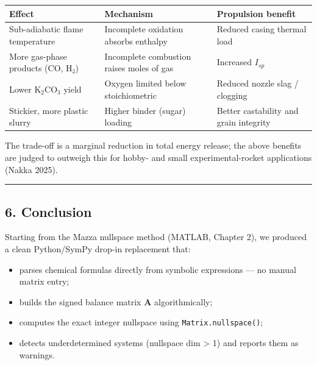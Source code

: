 \documentclass[11pt]{article}
\providecommand{\tightlist}{%
      \setlength{\itemsep}{0pt}\setlength{\parskip}{0pt}}
\begin{document}
{\def\LTcaptype{none} %
\begin{longtable}[]{@{}
  >{\raggedright\arraybackslash}p{}
  >{\raggedright\arraybackslash}p{}
  >{\raggedright\arraybackslash}p{}@{}}
\toprule\noalign{}
\begin{minipage}[b]{\linewidth}\raggedright
Effect
\end{minipage} & \begin{minipage}[b]{\linewidth}\raggedright
Mechanism
\end{minipage} & \begin{minipage}[b]{\linewidth}\raggedright
Propulsion benefit
\end{minipage} \\
\midrule\noalign{}
\endhead
\bottomrule\noalign{}
\endlastfoot
Sub-adiabatic flame temperature & Incomplete oxidation absorbs enthalpy
& Reduced casing thermal load \\
More gas-phase products (CO, H₂) & Incomplete combustion raises moles of
gas & Increased \(I_{sp}\) \\
Lower \(\text{K}_2\text{CO}_3\) yield & Oxygen limited below
stoichiometric & Reduced nozzle slag / clogging \\
Stickier, more plastic slurry & Higher binder (sugar) loading & Better
castability and grain integrity \\
\end{longtable}
}

The trade-off is a marginal reduction in total energy release; the above
benefits are judged to outweigh this for hobby- and small
experimental-rocket applications (Nakka 2025).

    \begin{center}\rule{0.5\linewidth}{0.5pt}\end{center}

\subsection{6. Conclusion}\label{conclusion}

Starting from the Mazza nullspace method (MATLAB, Chapter 2), we
produced a clean Python/SymPy drop-in replacement that:

\begin{itemize}
\tightlist
\item
  parses chemical formulas directly from symbolic expressions --- no
  manual matrix entry;
\item
  builds the signed balance matrix \(\mathbf{A}\) algorithmically;
\item
  computes the exact integer nullspace using
  \texttt{Matrix.nullspace()};
\item
  detects underdetermined systems (nullspace dim \textgreater{} 1) and
  reports them as warnings.
\end{itemize}
\end{document}
